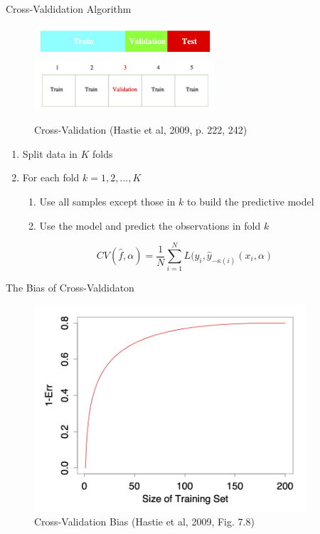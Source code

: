 \documentclass[10pt,handout]{beamer}
\begin{document}
\begin{frame}{Cross-Valdidation Algorithm}

\begin{figure}[h]
\caption{Cross-Validation (Hastie et al, 2009, p. 222, 242)}
\centering
\includegraphics[width=0.6\textwidth]{figs/ESL_test_train_val.png}
\includegraphics[width=0.6\textwidth]{figs/ESL_cross_val.png}
\end{figure}

\begin{enumerate}
\item Split data in $K$ folds
\item For each fold $k=1,2,...,K$
\begin{enumerate}
\item Use all samples except those in $k$ to build the predictive model
\item Use the model and predict the observations in fold $k$
\end{enumerate}
\end{enumerate}

\[
CV(\hat{f},\alpha) = \frac{1}{N}\sum^N_{i=1} L(y_i,\hat{y}_{-\kappa(i)}(x_i,\alpha)
\]

\end{frame}

\begin{frame}{The Bias of Cross-Valdidaton}

\begin{figure}[h]
\caption{Cross-Validation Bias (Hastie et al, 2009, Fig. 7.8)}
\centering
\includegraphics[width=0.9\textwidth]{figs/ESL_7_8.png}
\end{figure}

\end{frame}
\end{document}
